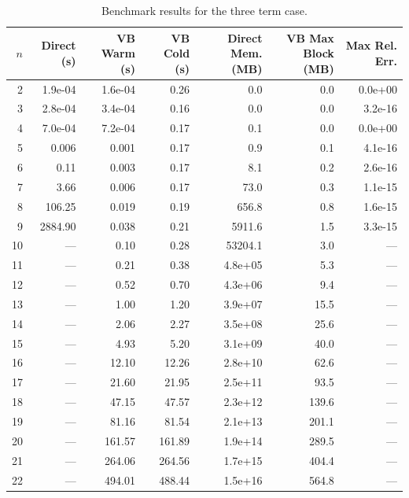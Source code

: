 \begin{table}[htbp]
\centering
\caption{Benchmark results for the three term case.}
\label{tab:benchmark_three_term}
\begin{tabular}{r r r r r r r}
\toprule
$n$ & Direct (s) & VB Warm (s) & VB Cold (s) & Direct Mem. (MB) & VB Max Block (MB) & Max Rel. Err. \\
\midrule
2 & 1.9e-04 & 1.6e-04 & 0.26 & 0.0 & 0.0 & 0.0e+00 \\
3 & 2.8e-04 & 3.4e-04 & 0.16 & 0.0 & 0.0 & 3.2e-16 \\
4 & 7.0e-04 & 7.2e-04 & 0.17 & 0.1 & 0.0 & 0.0e+00 \\
5 & 0.006 & 0.001 & 0.17 & 0.9 & 0.1 & 4.1e-16 \\
6 & 0.11 & 0.003 & 0.17 & 8.1 & 0.2 & 2.6e-16 \\
7 & 3.66 & 0.006 & 0.17 & 73.0 & 0.3 & 1.1e-15 \\
8 & 106.25 & 0.019 & 0.19 & 656.8 & 0.8 & 1.6e-15 \\
9 & 2884.90 & 0.038 & 0.21 & 5911.6 & 1.5 & 3.3e-15 \\
10 & --- & 0.10 & 0.28 & 53204.1 & 3.0 & --- \\
11 & --- & 0.21 & 0.38 & 4.8e+05 & 5.3 & --- \\
12 & --- & 0.52 & 0.70 & 4.3e+06 & 9.4 & --- \\
13 & --- & 1.00 & 1.20 & 3.9e+07 & 15.5 & --- \\
14 & --- & 2.06 & 2.27 & 3.5e+08 & 25.6 & --- \\
15 & --- & 4.93 & 5.20 & 3.1e+09 & 40.0 & --- \\
16 & --- & 12.10 & 12.26 & 2.8e+10 & 62.6 & --- \\
17 & --- & 21.60 & 21.95 & 2.5e+11 & 93.5 & --- \\
18 & --- & 47.15 & 47.57 & 2.3e+12 & 139.6 & --- \\
19 & --- & 81.16 & 81.54 & 2.1e+13 & 201.1 & --- \\
20 & --- & 161.57 & 161.89 & 1.9e+14 & 289.5 & --- \\
21 & --- & 264.06 & 264.56 & 1.7e+15 & 404.4 & --- \\
22 & --- & 494.01 & 488.44 & 1.5e+16 & 564.8 & --- \\
\bottomrule
\end{tabular}
\end{table}
